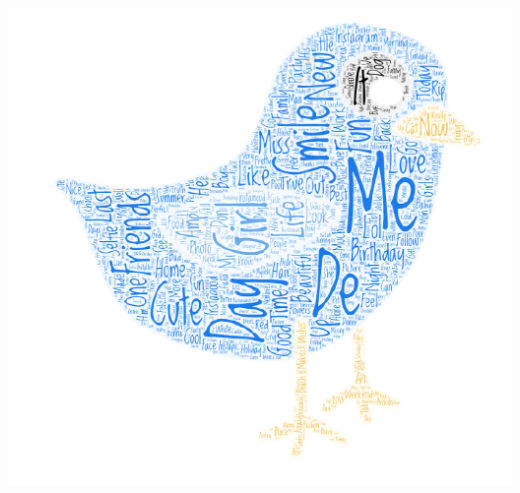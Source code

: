 \documentclass[11pt,twocolumn]{report}
\begin{document}
    \begin{center}
    \includegraphics[scale=0.45]{cloud}
    \end{center}



\end{document}
